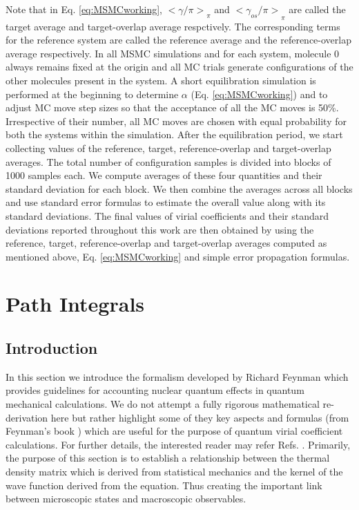         Note that in Eq. \eqref{eq:MSMCworking}, ${<\gamma/\pi>}_\pi$ and ${<\gamma_{os}/\pi>}_\pi$ are called the target average and target-overlap average respctively. The corresponding terms for the reference system are called the reference average and the reference-overlap average respectively. In all MSMC simulations and for each system, molecule 0 always remains fixed at the origin and all MC trials generate configurations of the other molecules present in the system. A short equilibration simulation is performed at the beginning to determine $\alpha$ (Eq. \eqref{eq:MSMCworking}) and to adjust MC move step sizes so that the acceptance of all the MC moves is 50\%. Irrespective of their number, all MC moves are chosen with equal probability for both the systems within the simulation. After the equilibration period, we start collecting values of the reference, target, reference-overlap and target-overlap averages. The total number of configuration samples is divided into blocks of 1000 samples each. We compute averages of these four quantities and their standard deviation for each block. We then combine the averages across all blocks and use standard error formulas to estimate the overall value along with its standard deviations. The final values of virial coefficients and their standard deviations reported throughout this work are then obtained by using the reference, target, reference-overlap and target-overlap averages computed as mentioned above, Eq. \eqref{eq:MSMCworking} and simple error propagation formulas.

\section{Path Integrals}
    \subsection{Introduction}
    In this section we introduce the formalism developed by Richard Feynman \cite{Feynman} which provides guidelines for accounting nuclear quantum effects in quantum mechanical calculations. We do not attempt a fully rigorous mathematical re-derivation here but rather highlight some of they key aspects and formulas (from Feynman's book \cite{Feynman}) which are useful for the purpose of quantum virial coefficient calculations. For further details, the interested reader may refer Refs. \cite{Fosdick:1966vh,Ceperley1995,Cui1997,Diep2000,Patkowski2008}. Primarily, the purpose of this section is to establish a relationship between the thermal density matrix which is derived from statistical mechanics and the kernel of the wave function derived from the \Schrodinger{} equation. Thus creating the important link between microscopic states and macroscopic observables.


